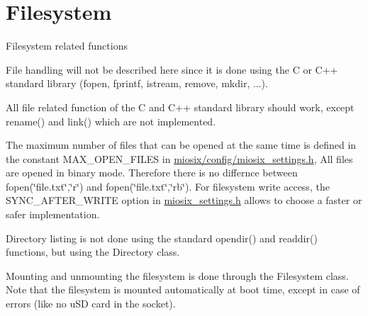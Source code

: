 \hypertarget{group___filesystem}{\section{Filesystem}
\label{group___filesystem}
}
Filesystem related functions

File handling will not be described here since it is done using the C or C++ standard library (fopen, fprintf, istream, remove, mkdir, ...).\par
 All file related function of the C and C++ standard library should work, except rename() and link() which are not implemented.\par
 The maximum number of files that can be opened at the same time is defined in the constant M\-A\-X\-\_\-\-O\-P\-E\-N\-\_\-\-F\-I\-L\-E\-S in \hyperlink{miosix__settings_8h}{miosix/config/miosix\-\_\-settings.\-h}, All files are opened in binary mode. Therefore there is no differnce between fopen(\char`\"{}file.\-txt\char`\"{},\char`\"{}r\char`\"{}) and fopen(\char`\"{}file.\-txt\char`\"{},\char`\"{}rb\char`\"{}). For filesystem write access, the S\-Y\-N\-C\-\_\-\-A\-F\-T\-E\-R\-\_\-\-W\-R\-I\-T\-E option in \hyperlink{miosix__settings_8h}{miosix\-\_\-settings.\-h} allows to choose a faster or safer implementation.

Directory listing is not done using the standard opendir() and readdir() functions, but using the Directory class.

Mounting and unmounting the filesystem is done through the Filesystem class. Note that the filesystem is mounted automatically at boot time, except in case of errors (like no u\-S\-D card in the socket). 